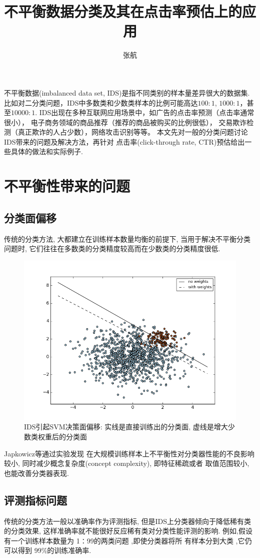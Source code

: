 \documentclass[draft,a4paper]{ctexart}
\title{不平衡数据分类及其在点击率预估上的应用}
\author{张航}
\begin{document}
\maketitle

不平衡数据(imbalanced data set, IDS)是指不同类别的样本量差异很大的数据集.
比如对二分类问题，IDS中多数类和少数类样本的比例可能高达\(100:1\),
\(1000:1\)，甚至\(10000:1\).
IDS出现在多种互联网应用场景中，如广告的点击率预测（点击率通常很小），
电子商务领域的商品推荐（推荐的商品被购买的比例很低），
交易欺诈检测（真正欺诈的人占少数），网络攻击识别等等。
本文先对一般的分类问题讨论IDS带来的问题及解决方法，再针对
点击率(click-through rate, CTR)预估给出一些具体的做法和实际例子.

\section{不平衡性带来的问题}
\subsection{分类面偏移}
传统的分类方法, 大都建立在训练样本数量均衡的前提下,
当用于解决不平衡分类问题时,
它们往往在多数类的分类精度较高而在少数类的分类精度很低.
\begin{figure}[tbp]
  \centering
  \includegraphics[width=.8\textwidth]{svm_unbalanced}
  \caption{IDS引起SVM决策面偏移: 实线是直接训练出的分类面,
  虚线是增大少数类权重后的分类面}
  \label{fig:svm_sep}
\end{figure}
Japkowicz等\cite{japkowicz2002class}通过实验发现
在大规模训练样本上不平衡性对分类器性能的不良影响较小,
同时减少概念复杂度(concept complexity), 即特征稀疏或者
取值范围较小, 也能改善分类器表现.

\subsection{评测指标问题}
传统的分类方法一般以准确率作为评测指标,
但是IDS上分类器倾向于降低稀有类的分类效果,
这样准确率就不能很好反应稀有类对分类性能评测的影响.
例如,假设有一个训练样本数量为 1∶99的两类问题 ,即使分类器将所
有样本分到大类 ,它仍可以得到 99\%的训练准确率.
\end{document}
